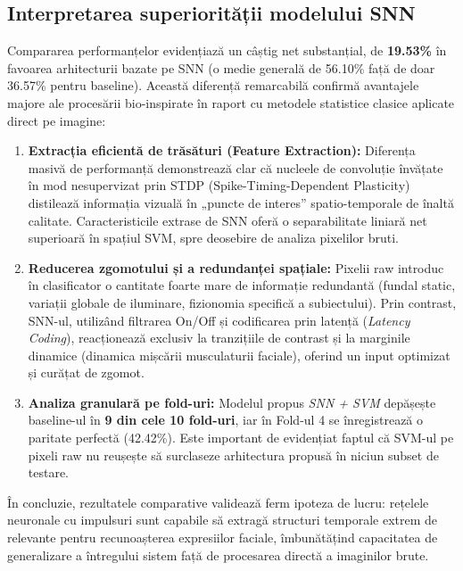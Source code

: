\subsection*{Interpretarea superiorității modelului SNN}

Compararea performanțelor evidențiază un câștig net substanțial, de \textbf{19.53\%} în favoarea arhitecturii bazate pe SNN (o medie generală de 56.10\% față de doar 36.57\% pentru baseline). Această diferență remarcabilă confirmă avantajele majore ale procesării bio-inspirate în raport cu metodele statistice clasice aplicate direct pe imagine:

\begin{enumerate}
	
	\item \textbf{Extracția eficientă de trăsături (Feature Extraction):} Diferența masivă de per\-for\-man\-ță demonstrează clar că nucleele de convoluție învățate în mod nesupervizat prin STDP (Spike-Timing-Dependent Plasticity) distilează informația vizuală în „puncte de interes” spatio-temporale de înaltă calitate. Caracteristicile extrase de SNN oferă o separabilitate liniară net superioară în spațiul SVM, spre deosebire de analiza pixelilor bruti.
	
	\item \textbf{Reducerea zgomotului și a redundanței spațiale:} Pixelii raw introduc în clasificator o cantitate foarte mare de informație redundantă (fundal static, variații globale de iluminare, fizionomia specifică a subiectului). Prin contrast, SNN-ul, utilizând filtrarea On/Off și codificarea prin latență (\textit{Latency Coding}), re\-ac\-ți\-o\-nea\-ză exclusiv la tranzițiile de contrast și la marginile dinamice (dinamica mișcării musculaturii faciale), oferind un input optimizat și curățat de zgomot.
	
	\item \textbf{Analiza granulară pe fold-uri:} Modelul propus \textit{SNN + SVM} depășește baseline-ul în \textbf{9 din cele 10 fold-uri}, iar în Fold-ul 4 se înregistrează o paritate perfectă (42.42\%). Este important de evidențiat faptul că SVM-ul pe pixeli raw nu reușește să surclaseze arhitectura propusă în niciun subset de testare.
	
\end{enumerate}

În concluzie, rezultatele comparative validează ferm ipoteza de lucru: rețelele neuronale cu impulsuri sunt capabile să extragă structuri temporale extrem de relevante pentru recunoașterea expresiilor faciale, îmbunătățind capacitatea de generalizare a întregului sistem față de procesarea directă a imaginilor brute.

